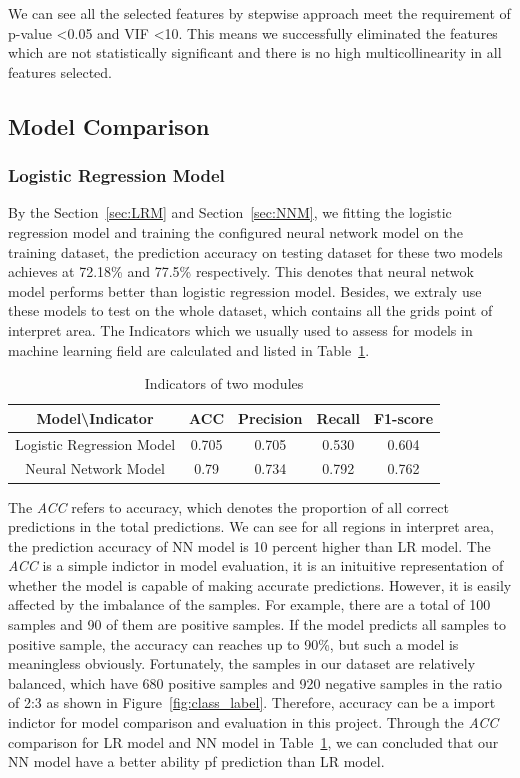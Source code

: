 \documentclass[final-report]{report-template}
\begin{document}
We can see all the selected features by stepwise approach meet the requirement of p-value \textless 0.05 and VIF \textless 10.
This means we successfully eliminated the features which are not statistically significant and there is no high multicollinearity in all features selected.  

\subsection{Model Comparison}
\subsubsection{Logistic Regression Model}
By the Section~\ref{sec:LRM} and Section~\ref{sec:NNM}, we fitting the logistic regression model and training the configured neural network model on the training dataset, 
the prediction accuracy on testing dataset for these two models achieves at 72.18\% and 77.5\% respectively. This denotes that neural netwok model performs better than logistic regression model.
Besides, we extraly use these models to test on the whole dataset, which contains all the grids point of interpret area.
The Indicators which we usually used to assess for models in machine learning field are calculated and listed in Table~\ref{tab:Indicators}.

\begin{table}[]
    \centering
    \caption{Indicators of two modules}
    \label{tab:Indicators}
    \begin{tabular}{|c|c|c|c|c|}
    \hline
    Model\textbackslash{}Indicator & ACC   & Precision & Recall & F1-score \\ \hline
    Logistic Regression Model      & 0.705 & 0.705     & 0.530  & 0.604    \\ \hline
    Neural Network Model           & 0.79  & 0.734     & 0.792  & 0.762    \\ \hline
    \end{tabular}
    \end{table}
The \textit{ACC} refers to accuracy, which denotes the proportion of all correct predictions in the total predictions. 
We can see for all regions in interpret area, the prediction accuracy of NN model is 10 percent higher than LR model.
The \textit{ACC} is a simple indictor in model evaluation, it is an inituitive representation of whether the model is capable of making accurate predictions.
However, it is easily affected by the imbalance of the samples. For example, there are a total of 100 samples and 90 of them are positive samples.
If the model predicts all samples to positive sample, the accuracy can reaches up to 90\%, but such a model is meaningless obviously.  
Fortunately, the samples in our dataset are relatively balanced, which have 680 positive samples and 920 negative samples in the ratio of 2:3 as shown in Figure~\ref{fig:class_label}.
Therefore, accuracy can be a import indictor for model comparison and evaluation in this project. 
Through the \textit{ACC} comparison for LR model and NN model in Table~\ref{tab:Indicators}, we can concluded that our NN model have a better ability pf prediction than LR model.
\end{document}
